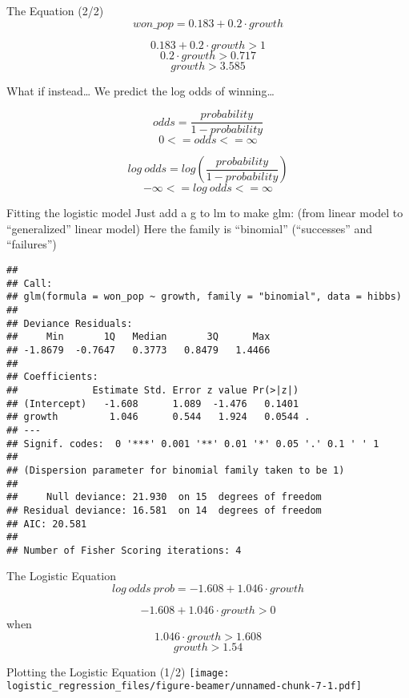 \documentclass[
  ignorenonframetext,
]{beamer}
\begin{document}
\begin{frame}{The Equation (2/2)}
\protect\hypertarget{the-equation-22}{}
\[won\_pop = 0.183 + 0.2 \cdot growth\]

\[ 0.183 + 0.2\cdot growth > 1\] \[ 0.2 \cdot growth > 0.717\]
\[ growth > 3.585\]
\end{frame}

\begin{frame}{What if instead\ldots{}}
\protect\hypertarget{what-if-instead}{}
We predict the log odds of winning\ldots{}

\[odds = \frac{probability}{1-probability}\] \[ 0 <= odds <= \infty \]

\[ log\ odds = log(\frac{probability}{1-probability}) \]
\[ -\infty <= log\ odds <= \infty \]
\end{frame}

\begin{frame}[fragile]{Fitting the logistic model}
\protect\hypertarget{fitting-the-logistic-model}{}
Just add a g to lm to make glm: (from linear model to ``generalized''
linear model) Here the family is ``binomial'' (``successes'' and
``failures'')

\begin{verbatim}
## 
## Call:
## glm(formula = won_pop ~ growth, family = "binomial", data = hibbs)
## 
## Deviance Residuals: 
##     Min       1Q   Median       3Q      Max  
## -1.8679  -0.7647   0.3773   0.8479   1.4466  
## 
## Coefficients:
##             Estimate Std. Error z value Pr(>|z|)  
## (Intercept)   -1.608      1.089  -1.476   0.1401  
## growth         1.046      0.544   1.924   0.0544 .
## ---
## Signif. codes:  0 '***' 0.001 '**' 0.01 '*' 0.05 '.' 0.1 ' ' 1
## 
## (Dispersion parameter for binomial family taken to be 1)
## 
##     Null deviance: 21.930  on 15  degrees of freedom
## Residual deviance: 16.581  on 14  degrees of freedom
## AIC: 20.581
## 
## Number of Fisher Scoring iterations: 4
\end{verbatim}
\end{frame}

\begin{frame}{The Logistic Equation}
\protect\hypertarget{the-logistic-equation}{}
\[log\ odds\ prob = -1.608 + 1.046 \cdot growth\]

\[ -1.608 + 1.046 \cdot growth > 0 \] when
\[ 1.046 \cdot growth > 1.608\] \[ growth > 1.54 \]
\end{frame}

\begin{frame}{Plotting the Logistic Equation (1/2)}
\protect\hypertarget{plotting-the-logistic-equation-12}{}
\texttt{[image: logistic\_regression\_files/figure-beamer/unnamed-chunk-7-1.pdf]}
\end{frame}
\end{document}
